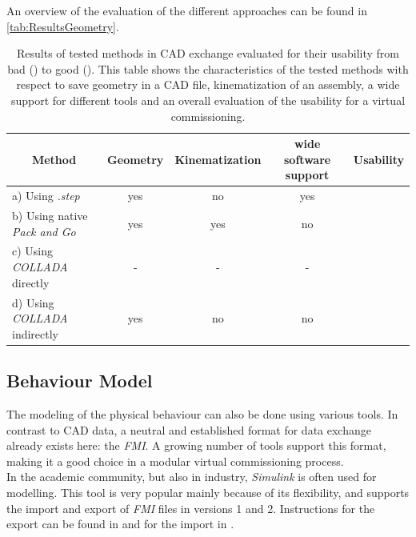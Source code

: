     An overview of the evaluation of the different approaches can be found in \autoref{tab:ResultsGeometry}.
      \begin{table}[htp]
    	\footnotesize
    	\centering
    	\caption[Results of tested methods in CAD exchange.]{Results of tested methods in CAD exchange evaluated for their usability from bad (\fullmoon  \fullmoon  \fullmoon) to good (\newmoon \newmoon \newmoon). This table shows the characteristics of the tested methods with respect to save geometry in a CAD file, kinematization of an assembly, a wide support for different tools and an overall evaluation of the usability for a virtual commissioning.}
    	\begin{tabular}{lcccc}
    		\toprule
    		\multicolumn{1}{c}{Method} & \multicolumn{1}{c}{Geometry} & \multicolumn{1}{c}{Kinematization} & \multicolumn{1}{c}{wide software support} & \multicolumn{1}{c}{Usability}\\
    		\midrule
    		a) Using \textit{.step} & yes & no & yes & \newmoon \newmoon \fullmoon\\
    		b) Using native \textit{Pack and Go} & yes & yes & no & \newmoon \newmoon \fullmoon\\
    		c) Using \textit{COLLADA} directly & - & - & - & \fullmoon \fullmoon \fullmoon \\
    		d) Using \textit{COLLADA} indirectly & yes & no & no & \newmoon \fullmoon \fullmoon\\
    		\bottomrule
    	\end{tabular}	
    	\label{tab:ResultsGeometry}
    \end{table}
    
    \subsection{Behaviour Model}
    The modeling of the physical behaviour can also be done using various tools. In contrast to CAD data, a neutral and established format for data exchange already exists here: the \textit{FMI}. A growing number of tools support this format, making it a good choice in a modular virtual commissioning process. \\
    
    In the academic community, but also in industry, \textit{Simulink} is often used for modelling. This tool is very popular mainly because of its flexibility, and supports the import and export of \textit{FMI} files in versions 1 and 2. Instructions for the export can be found in \cite{MatlabFmuExport} and for the import in \cite{MatlabFmuImport}. 
    
